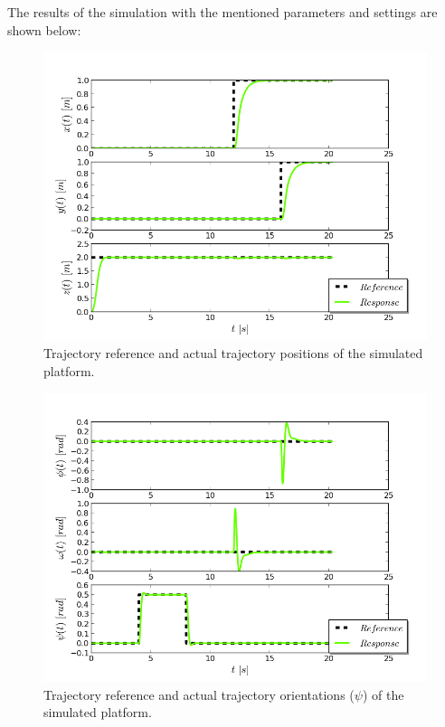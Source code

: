 The results of the simulation with the mentioned parameters and settings are shown below:\\

\begin{figure}[h!]
\centering
\includegraphics[scale=0.7]{Images/Chapter5/ardrone/position_control.png}
\caption{Trajectory reference and actual trajectory positions of the simulated platform.}
\label{fig:ardrone_pos}
\end{figure}

\begin{figure}[h!]
\centering
\includegraphics[scale=0.7]{Images/Chapter5/ardrone/euler_angle_control.png}
\caption{Trajectory reference and actual trajectory orientations ($\psi$) of the simulated platform.}
\label{fig:ardrone_ang}
\end{figure}

